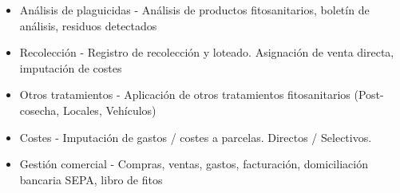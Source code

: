 \begin{itemize}
\begin{itemize}
\item Análisis de plaguicidas - Análisis de productos fitosanitarios, boletín de análisis, residuos detectados
\item Recolección - Registro de recolección y loteado. Asignación de venta directa, imputación de costes
\item Otros tratamientos - Aplicación de otros tratamientos fitosanitarios (Post-cosecha, Locales, Vehículos)
\item Costes - Imputación de gastos / costes a parcelas. Directos / Selectivos.
\item Gestión comercial - Compras, ventas, gastos, facturación, domiciliación bancaria SEPA, libro de fitos 
\end{itemize}
\end{itemize}